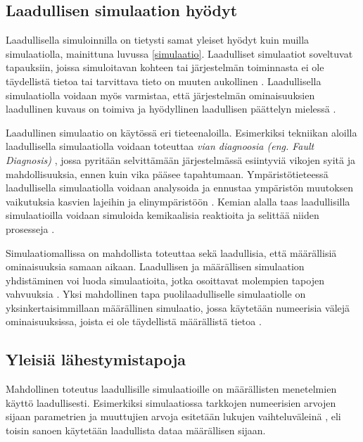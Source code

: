 \documentclass[utf8]{gradu3}
\begin{document}
\subsection{Laadullisen simulaation hyödyt}
Laadullisella simuloinnilla on tietysti samat yleiset hyödyt 
kuin muilla simulaatiolla, mainittuna luvussa \ref{simulaatio}. 
Laadulliset simulaatiot soveltuvat tapauksiin, 
joissa simuloitavan kohteen tai järjestelmän toiminnasta 
ei ole täydellistä tietoa tai tarvittava tieto on 
muuten aukollinen \parencite{kuipers1986qualitative}. 
Laadullisella simulaatiolla voidaan myös varmistaa, että järjestelmän
ominaisuuksien laadullinen kuvaus on toimiva ja hyödyllinen 
laadullisen päättelyn mielessä \parencite{kuipers1986qualitative}.

Laadullinen simulaatio on käytössä eri tieteenaloilla.
Esimerkiksi tekniikan aloilla laadullisella simulaatiolla voidaan toteuttaa
\textit{vian diagnoosia (eng. Fault Diagnosis)} \parencite{QualitativeReasoning1997},
jossa pyritään selvittämään järjestelmässä esiintyviä vikojen syitä ja mahdollisuuksia, 
ennen kuin vika pääsee tapahtumaan.
Ympäristötieteessä laadullisella simulaatiolla voidaan analysoida ja ennustaa
ympäristön muutoksen vaikutuksia kasvien lajeihin ja elinympäristöön \parencite{qualiAnalysisEnviron2010}.
Kemian alalla taas laadullisilla simulaatioilla voidaan simuloida kemikaalisia 
reaktioita ja selittää niiden prosesseja \parencite{chemistryQualitativeSim2002}.

Simulaatiomallissa on mahdollista toteuttaa sekä laadullisia, 
että määrällisiä ominaisuuksia samaan aikaan. 
Laadullisen ja määrällisen simulaation yhdistäminen voi luoda simulaatioita, 
jotka osoittavat molempien tapojen vahvuuksia 
\parencite{semiHybrid1997qualitative}. 
Yksi mahdollinen tapa puolilaadulliselle simulaatiolle on yksinkertaisimmillaan
määrällinen simulaatio, jossa käytetään numeerisia välejä ominaisuuksissa, 
joista ei ole täydellistä määrällistä tietoa \parencite{semiHybrid1997qualitative}.

\subsection{Yleisiä lähestymistapoja} \label{yleiset menetelmat}
Mahdollinen toteutus laadullisille simulaatioille on määrällisten menetelmien 
käyttö laadullisesti.
Esimerkiksi simulaatiossa tarkkojen numeerisien arvojen sijaan
parametrien ja muuttujien arvoja esitetään 
lukujen vaihteluväleinä \parencite{qualApproaches2004}, eli toisin sanoen
käytetään laadullista dataa määrällisen sijaan.
\end{document}
